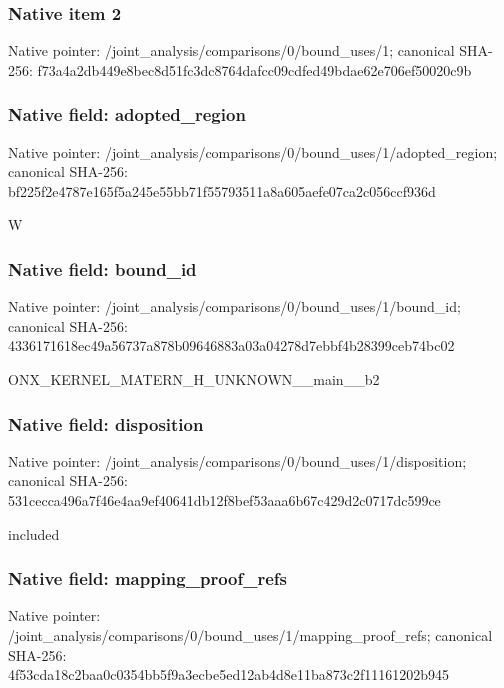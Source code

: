 \documentclass[10pt,a4paper]{article}
\begin{document}
\subsubsection{Native item 2}
Native pointer: /joint\_\allowbreak{}analysis/comparisons/0/bound\_\allowbreak{}uses/1; canonical SHA-256: f73a4a2db449e8bec8d51fc3dc8764dafcc09cdfed49bdae62e706ef50020c9b

\subsubsection{Native field: adopted\_\allowbreak{}region}
Native pointer: /joint\_\allowbreak{}analysis/comparisons/0/bound\_\allowbreak{}uses/1/adopted\_\allowbreak{}region; canonical SHA-256: bf225f2e4787e165f5a245e55bb71f55793511a8a605aefe07ca2c056ccf936d

\begingroup\raggedright\sloppy W\par\endgroup

\subsubsection{Native field: bound\_\allowbreak{}id}
Native pointer: /joint\_\allowbreak{}analysis/comparisons/0/bound\_\allowbreak{}uses/1/bound\_\allowbreak{}id; canonical SHA-256: 4336171618ec49a56737a878b09646883a03a04278d7ebbf4b28399ceb74bc02

\begingroup\raggedright\sloppy ONX\_\allowbreak{}KERNEL\_\allowbreak{}MATERN\_\allowbreak{}H\_\allowbreak{}UNKNOWN\_\allowbreak{}\_\allowbreak{}main\_\allowbreak{}\_\allowbreak{}b2\par\endgroup

\subsubsection{Native field: disposition}
Native pointer: /joint\_\allowbreak{}analysis/comparisons/0/bound\_\allowbreak{}uses/1/disposition; canonical SHA-256: 531cecca496a7f46e4aa9ef40641db12f8bef53aaa6b67c429d2c0717dc599ce

\begingroup\raggedright\sloppy included\par\endgroup

\subsubsection{Native field: mapping\_\allowbreak{}proof\_\allowbreak{}refs}
Native pointer: /joint\_\allowbreak{}analysis/comparisons/0/bound\_\allowbreak{}uses/1/mapping\_\allowbreak{}proof\_\allowbreak{}refs; canonical SHA-256: 4f53cda18c2baa0c0354bb5f9a3ecbe5ed12ab4d8e11ba873c2f11161202b945
\end{document}
